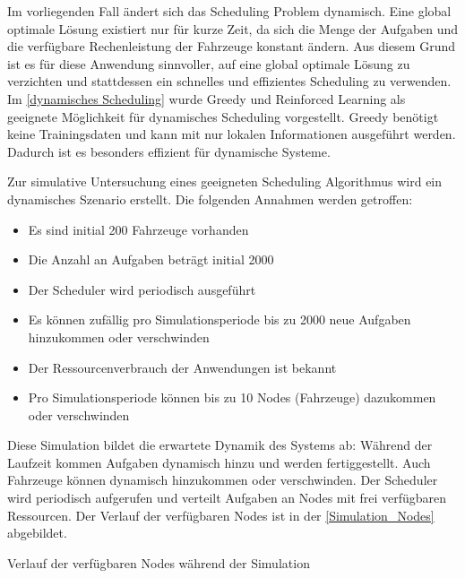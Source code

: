 Im vorliegenden Fall ändert sich das Scheduling Problem dynamisch. Eine global optimale Lösung existiert nur für kurze Zeit, da sich die Menge der Aufgaben und die verfügbare Rechenleistung der Fahrzeuge konstant ändern. Aus diesem Grund ist es für diese Anwendung sinnvoller, auf eine global optimale Lösung zu verzichten und stattdessen ein schnelles und effizientes Scheduling zu verwenden. Im \autoref{dynamisches Scheduling} wurde Greedy und Reinforced Learning als geeignete Möglichkeit für dynamisches Scheduling vorgestellt. Greedy benötigt keine Trainingsdaten und kann  mit nur lokalen Informationen ausgeführt werden. Dadurch ist es besonders effizient für dynamische Systeme.

Zur simulative Untersuchung eines geeigneten Scheduling Algorithmus wird ein dynamisches Szenario erstellt. Die folgenden Annahmen werden getroffen:

\begin{itemize}
	\item Es sind initial 200 Fahrzeuge vorhanden
	\item Die Anzahl an Aufgaben beträgt initial 2000
	\item Der Scheduler wird periodisch ausgeführt
	\item Es können zufällig pro Simulationsperiode bis zu 2000 neue Aufgaben hinzukommen oder verschwinden
	\item Der Ressourcenverbrauch der Anwendungen ist bekannt
	\item Pro Simulationsperiode können bis zu 10 Nodes (Fahrzeuge) dazukommen oder verschwinden
\end{itemize}

Diese Simulation bildet die erwartete Dynamik des Systems ab: Während der Laufzeit kommen Aufgaben dynamisch hinzu und werden fertiggestellt. Auch Fahrzeuge können dynamisch hinzukommen oder verschwinden. Der Scheduler wird periodisch aufgerufen und verteilt Aufgaben an Nodes mit frei verfügbaren Ressourcen. Der Verlauf der verfügbaren Nodes ist in der \autoref{Simulation_Nodes} abgebildet.

  \caption{Verlauf der verfügbaren Nodes während der Simulation}

